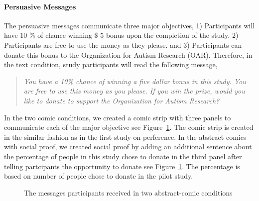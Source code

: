 \paragraph{Persuasive Messages}

The persuasive messages communicate three major objectives, 1) Participants will have 10 \% of chance winning \$ 5 bonus upon the completion of the study. 2) Participants are free to use the money as they please. and 3) Participants can donate this bonus to the Organization for Autism Research (OAR). Therefore, in the text condition, study participants will read the following message,
\begin{quote}
  \textit{You have a 10\% chance of winning a five dollar bonus in this study. You are free to use this money as you please. If you win the prize, would you like to donate to support the Organization for Autism Research?}
\end{quote}
In the two comic conditions, we created a comic strip with three panels to communicate each of the major objective see Figure~\ref{fig:comic_messages_in_two_conditions}. The comic strip is created in the similar fashion as in the first study on perference. In the abstract comics with social proof, we created social proof by adding an additional sentence about the percentage of people in this study chose to donate in the third panel after telling partcipants the opportunity to donate see Figure~\ref{fig:comic_messages_in_two_conditions}. The percentage is based on number of people chose to donate in the pilot study.

\begin{figure}
  \hfill
 \caption{The messages participants received in two abstract-comic conditions}
 \label{fig:comic_messages_in_two_conditions}
\end{figure}

